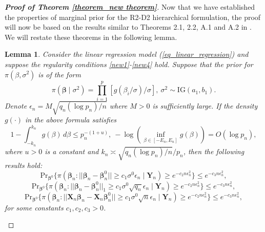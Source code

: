 \documentclass[12pt]{article}
\newtheorem{lemma}{Lemma}
\begin{document}

\begin{proof} [\textbf{Proof of Theorem \ref{theorem_new theorem}}]
	Now that we have established the properties of marginal prior for the R2-D2 hierarchical formulation, the proof will now be based on the results similar to Theorems 2.1, 2.2, A.1 and A.2  in \cite{song2017nearly}.  We will restate these theorems in the following lemma.

	\begin{lemma}\label{lemmaB1}
		Consider the linear regression model (\ref{eq_linear_regression}) and suppose the regularity conditions  \ref{new1}-\ref{new4}  hold. Suppose that the prior for $\pi(\beta, \sigma^2)$ is of the form
		\[
		\pi(\bm\beta\mid \sigma^2)  = \prod\limits_{i=1}^p [g(\beta_i/\sigma) / \sigma ], \ \sigma^2 \sim \text{IG} (a_1, b_1).
		\]
		Denote $\epsilon_n = M\sqrt{q_n (\log p_n)/n}$  where   $M>0$ is sufficiently large.
		If the density $g(\cdot)$  in the above formula satisfies
		\begin{equation}\label{condition_b1}
		1 - \int_{-k_n}^{k_n} g(\beta)\, d\beta \leq p_n^{-(1+u)},  \
		-\log\left(  \inf\limits_{\beta\in[-E_n, E_n]} g(\beta) \right) = O(\log p_n),
		\end{equation}
		where $u>0$ is a constant and $k_n \asymp \sqrt{q_n (\log p_n)/n}/p_n$, then the following  results hold:
		\[
		\text{Pr}_{\bm\beta^0} \Big\{\pi (\bm\beta_n: || \bm\beta_n - \bm\beta^0_n || \geq c_1 \sigma^0 \epsilon_n \mid \bm Y_n ) \geq e^{-c_2 n\epsilon_n^2}   \Big\}  \leq e^{-c_3 n\epsilon_n^2},
		\]
		\[
		\text{Pr}_{\bm\beta^0} \Big\{ \pi (\bm\beta_n: || \bm\beta_n - \bm\beta^0_n ||_1 \geq c_1 \sigma^0  \sqrt{q_n}\epsilon_n \mid \bm Y_n ) \geq e^{-c_2 n\epsilon_n^2}   \Big\}   \leq e^{-c_3 n\epsilon_n^2},
		\]
		\[
		\text{Pr}_{\bm\beta^0} \Big\{ \pi (\bm\beta_n: || \bm X_n\bm\beta_n - \bm X_n \bm\beta^0_n || \geq c_1 \sigma ^0 \sqrt{n}\epsilon_n \mid \bm Y_n ) \geq e^{-c_2 n\epsilon_n^2}   \Big\}  \leq e^{-c_3 n\epsilon_n^2},
		\]
		for some constants $c_1, c_2, c_3>0$.
	\end{lemma}


\end{proof}
\end{document}
